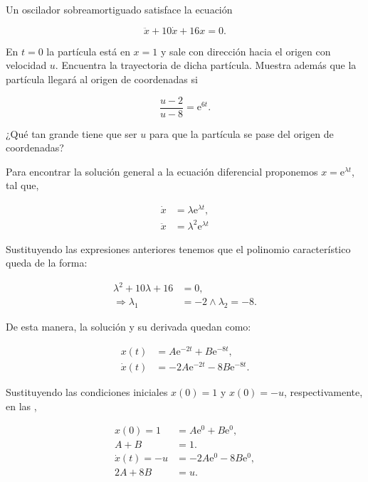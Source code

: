 \documentclass[../main.tex]{subfiles}
\begin{document}
\begin{problema}
	Un oscilador sobreamortiguado satisface la ecuación

	\begin{equation*}
		\ddot{x} + 10\dot{x} + 16x = 0.
	\end{equation*}

	En \(t = 0\) la partícula está en \(x = 1\) y sale con
	dirección hacia el origen con velocidad \(u\).
	Encuentra la trayectoria de dicha partícula.
	Muestra además que la partícula llegará al origen de
	coordenadas si

	\begin{equation}
		\dfrac{u - 2}{u - 8} = \mathrm{e}^{6t}.
		\label{eq:condition}
	\end{equation}

	¿Qué tan grande tiene que ser \(u\) para que la
	partícula se pase del origen de coordenadas?
\end{problema}

\startsolution

Para encontrar la solución general a la ecuación diferencial
proponemos \(x = \mathrm{e}^{\lambda t}\), tal que,

\begin{align*}
	\dot{x}  & = \lambda \mathrm{e}^{\lambda t},    \\
	\ddot{x} & = \lambda^{2} \mathrm{e}^{\lambda t}
\end{align*}

Sustituyendo las expresiones anteriores tenemos que el polinomio
característico queda de la forma:

\begin{align*}
	\lambda^{2} + 10\lambda + 16 & = 0,                          \\
	\Longrightarrow \lambda_{1}  & = -2 \wedge \lambda_{2} = -8.
\end{align*}

De esta manera, la solución y su derivada quedan como:

\begin{align}
	x(t)       & = A \mathrm{e}^{-2t} + B \mathrm{e}^{-8t},\label{eq:sol-pos}    \\
	\dot{x}(t) & = -2A \mathrm{e}^{-2t} - 8B \mathrm{e}^{-8t}.\label{eq:sol-vel}
\end{align}

Sustituyendo las condiciones iniciales \(x(0) = 1\) y \(x(0) = -u\),
respectivamente, en las ,

\begin{align}
	x(0) = 1        & = A \mathrm{e}^{0} + B \mathrm{e}^{0},\nonumber    \\
	A + B           & = 1.\label{eq:first-syst}                          \\
	\dot{x}(t) = -u & = -2A \mathrm{e}^{0} - 8B \mathrm{e}^{0},\nonumber \\
	2A + 8B         & = u.\label{eq:second-syst}
\end{align}
\end{document}
